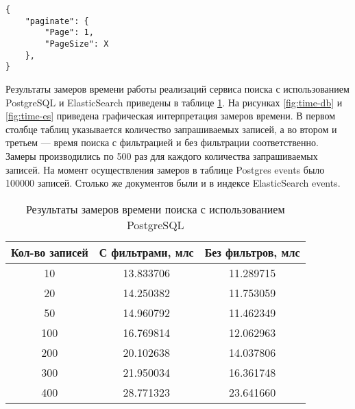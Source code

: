 \begin{center}
	\captionsetup{justification=raggedright,singlelinecheck=off}
	\begin{lstlisting}[label=lst:req-wf,caption=Параметры запроса без указания фильтрациии и сортировки]
{
	"paginate": {
		"Page": 1,
		"PageSize": X
	},
}
	\end{lstlisting}
\end{center}

Результаты замеров времени работы реализаций сервиса поиска с использованием PostgreSQL и ElasticSearch приведены в таблице \ref{tbl:time}. На рисунках \ref{fig:time-db} и \ref{fig:time-es} приведена графическая интерпретация замеров времени. В первом столбце таблиц указывается количество запрашиваемых записей, а во втором и третьем --- время поиска с фильтрацией и без фильтрации соответственно. Замеры производились по 500 раз для каждого количества запрашиваемых записей. На момент осуществления замеров в таблице Postgres events было 100000 записей. Столько же документов были и в индексе ElasticSearch events.

\begin{table}[h]
	\centering
	\captionsetup{justification=raggedright,singlelinecheck=off}
	\caption{Результаты замеров времени поиска с использованием PostgreSQL}
	\label{tbl:time}
	\begin{tabular}{|c|c|c|}
		\hline
		Кол-во записей & С фильтрами, млс & Без фильтров, млс \\ \hline
		      10       &    13.833706    &    11.289715     \\ \hline
		      20       &    14.250382    &    11.753059     \\ \hline
		      50       &    14.960792    &    11.462349     \\ \hline
		     100       &    16.769814    &    12.062963     \\ \hline
		     200       &    20.102638    &    14.037806     \\ \hline
		     300       &    21.950034    &    16.361748     \\ \hline
		     400       &    28.771323    &    23.641660     \\ \hline
	\end{tabular}
\end{table}

